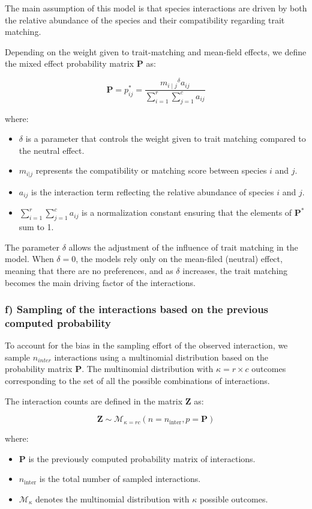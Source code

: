 The main assumption of this model is that species interactions are driven by both the relative abundance of the species and their compatibility regarding trait matching.

Depending on the weight given to trait-matching and mean-field effects, we define the mixed effect probability matrix $\mathbf{P}$ as: 

$$
    \mathbf{P} = p^*_{ij} = \frac{{m_{i\mid j}}^\delta a_{ij}}{\sum_{i=1}^{r} \sum_{j=1}^{c}a_{ij}}
$$
    
where:
\begin{itemize}
\item  $\delta$ is a parameter that controls the weight given to trait matching compared to the neutral effect.
\item  $m_{i|j}$ represents the compatibility or matching score between species \(i\) and \(j\).
\item  $a_{ij}$ is the interaction term reflecting the relative abundance of species \(i\) and \(j\).
\item  $\sum_{i=1}^{r} \sum_{j=1}^{c}a_{ij}$ is a normalization constant ensuring that the elements of \(\mathbf{P}^*\) sum to 1.
\end{itemize}

The parameter $\delta$ allows the adjustment of the influence of trait matching in the model. When $\delta = 0$, the models rely only on the mean-filed (neutral) effect, meaning that there are no preferences, and as $\delta$ increases, the trait matching becomes the main driving factor of the interactions.



\subsubsection{f) Sampling of the interactions based on the previous computed probability}

To account for the bias in the sampling effort of the observed interaction, we sample $n_{inter}$ interactions using a multinomial distribution based on the probability matrix $\mathbf{P}$. The multinomial distribution with $\kappa = r \times c$ outcomes corresponding to the set of all the possible combinations of interactions.

The interaction counts are defined in the matrix $\mathbf{Z}$ as:

$$
    \mathbf{Z} \sim \mathcal{M}_{\kappa = rc}(n = n_\text{inter}, p = \mathbf{P})
$$

where:
\begin{itemize}
    \item $\mathbf{P}$ is the previously computed probability matrix of interactions.
    \item  $n_{\text{inter}}$ is the total number of sampled interactions.
    \item  $\mathcal{M}_{\kappa}$ denotes the multinomial distribution with \(\kappa\) possible outcomes.
\end{itemize}




